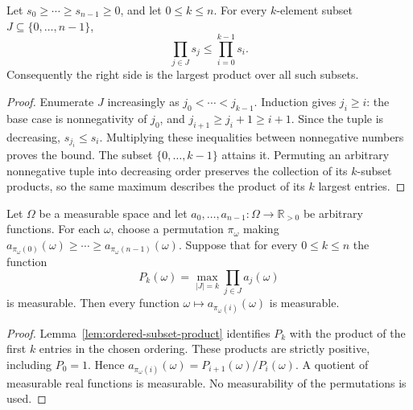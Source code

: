 \begin{lemma}
\label{lem:ordered-subset-product}
\leanok
{}
Let $s_0\geq\cdots\geq s_{n-1}\geq0$, and let $0\leq k\leq n$.
For every $k$-element subset $J\subseteq\{0,\ldots,n-1\}$,
\[
 \prod_{j\in J}s_j\leq\prod_{i=0}^{k-1}s_i.
\]
Consequently the right side is the largest product over all such subsets.
\end{lemma}
\begin{proof}
Enumerate $J$ increasingly as $j_0<\cdots<j_{k-1}$. Induction gives
$j_i\geq i$: the base case is nonnegativity of $j_0$, and
$j_{i+1}\geq j_i+1\geq i+1$. Since the tuple is decreasing,
$s_{j_i}\leq s_i$. Multiplying these inequalities between nonnegative
numbers proves the bound. The subset $\{0,\ldots,k-1\}$ attains it.
Permuting an arbitrary nonnegative tuple into decreasing order preserves
the collection of its $k$-subset products, so the same maximum describes
the product of its $k$ largest entries.
\end{proof}

\begin{lemma}
\label{lem:measurable-ordered-tuple}
\leanok
{}
Let $\Omega$ be a measurable space and let
$a_0,\ldots,a_{n-1}:\Omega\to\mathbb R_{>0}$ be arbitrary functions.
For each $\omega$, choose a permutation $\pi_\omega$ making
$a_{\pi_\omega(0)}(\omega)\geq\cdots\geq a_{\pi_\omega(n-1)}(\omega)$.
Suppose that for every $0\leq k\leq n$ the function
\[
 P_k(\omega)=\max_{|J|=k}\prod_{j\in J}a_j(\omega)
\]
is measurable. Then every function
$\omega\mapsto a_{\pi_\omega(i)}(\omega)$ is measurable.
\end{lemma}
\begin{proof}
Lemma~\ref{lem:ordered-subset-product} identifies $P_k$ with the product
of the first $k$ entries in the chosen ordering. These products are
strictly positive, including $P_0=1$. Hence
$a_{\pi_\omega(i)}(\omega)=P_{i+1}(\omega)/P_i(\omega)$.
A quotient of measurable real functions is measurable. No measurability
of the permutations is used.
\end{proof}

